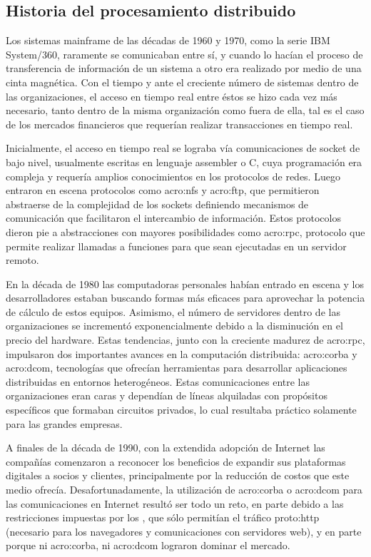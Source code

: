 \subsection{Historia del procesamiento distribuido}
\label{soa:historia}

Los sistemas mainframe de las décadas de 1960 y 1970, como la serie IBM System/360, raramente se comunicaban entre sí, y cuando lo hacían el proceso de transferencia de información de un sistema a otro era realizado por medio de una cinta magnética. Con el tiempo y ante el creciente número de sistemas dentro de las organizaciones, el acceso en tiempo real entre éstos se hizo cada vez más necesario, tanto dentro de la misma organización como fuera de ella, tal es el caso de los mercados financieros que requerían realizar transacciones en tiempo real.

Inicialmente, el acceso en tiempo real se lograba vía comunicaciones de socket de bajo nivel, usualmente escritas en lenguaje assembler o C, cuya programación era compleja y requería amplios conocimientos en los protocolos de redes. Luego entraron en escena protocolos como \gls{acro:nfs} y \gls{acro:ftp}, que permitieron abstraerse de la complejidad de los sockets definiendo mecanismos de comunicación que facilitaron el intercambio de información. Estos protocolos dieron pie a abstracciones con mayores posibilidades como \gls{acro:rpc}, protocolo que permite realizar llamadas a funciones para que sean ejecutadas en un servidor remoto.

En la década de 1980 las computadoras personales habían entrado en escena y los desarrolladores estaban buscando formas más eficaces para aprovechar la potencia de cálculo de estos equipos. Asimismo, el número de servidores dentro de las organizaciones se incrementó exponencialmente debido a la disminución en el precio del hardware. Estas tendencias, junto con la creciente madurez de \gls{acro:rpc}, impulsaron dos importantes avances en la computación distribuida: \gls{acro:corba} y \gls{acro:dcom}, tecnologías que ofrecían herramientas para desarrollar aplicaciones distribuidas en entornos heterogéneos. Estas comunicaciones entre las organizaciones eran caras y dependían de líneas alquiladas con propósitos específicos que formaban circuitos privados, lo cual resultaba práctico solamente para las grandes empresas.

A finales de la década de 1990, con la extendida adopción de Internet las compañías comenzaron a reconocer los beneficios de expandir sus plataformas digitales a socios y clientes, principalmente por la reducción de costos que este medio ofrecía. Desafortunadamente, la utilización de \gls{acro:corba} o \gls{acro:dcom} para las comunicaciones en Internet resultó ser todo un reto, en parte debido a las restricciones impuestas por los , que sólo permitían el tráfico \gls{proto:http} (necesario para los navegadores y comunicaciones con servidores web), y en parte porque ni \gls{acro:corba}, ni \gls{acro:dcom} lograron dominar el mercado.

